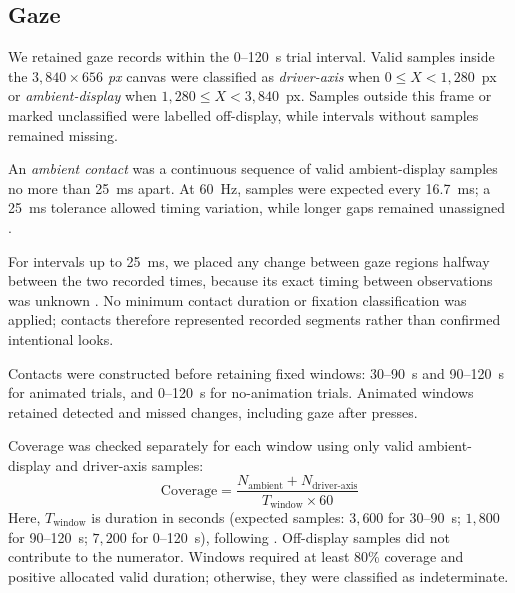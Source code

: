 \documentclass[
english,                 %
bibtex,                  %
includeExtraAbstracts, %
]{kththesis}
\numberwithin{listing}{chapter}
\begin{document}
\subsection{Gaze}
\label{sec:gaze}

We retained gaze records within the 0--120~s trial interval. Valid samples inside the \emph{\(3{,}840 \times 656\) px} canvas were classified as \emph{driver-axis} when \(0 \leq X < 1{,}280\)~px or \emph{ambient-display} when \(1{,}280 \leq X < 3{,}840\)~px. Samples outside this frame or marked unclassified were labelled off-display, while intervals without samples remained missing.

An \emph{ambient contact} was a continuous sequence of valid ambient-display samples no more than 25~ms apart. At 60~Hz, samples were expected every 16.7~ms; a 25~ms tolerance allowed timing variation, while longer gaps remained unassigned \cite{niehorster_fundamentals_2026}.

For intervals up to 25~ms, we placed any change between gaze regions halfway between the two recorded times, because its exact timing between observations was unknown \cite{andersson_sampling_2010}. No minimum contact duration or fixation classification was applied; contacts therefore represented recorded segments rather than confirmed intentional looks.

Contacts were constructed before retaining fixed windows: 30--90~s and 90--120~s for animated trials, and 0--120~s for no-animation trials. Animated windows retained detected and missed changes, including gaze after presses.

Coverage was checked separately for each window using only valid ambient-display and driver-axis samples:
\[
\text{Coverage} =
\frac{N_{\text{ambient}} + N_{\text{driver-axis}}}
{T_{\text{window}} \times 60}
\]
Here, \(T_{\text{window}}\) is duration in seconds (expected samples: \(3{,}600\) for 30--90~s; \(1{,}800\) for 90--120~s; \(7{,}200\) for 0--120~s), following \cite{niehorster_fundamentals_2026}. Off-display samples did not contribute to the numerator. Windows required at least 80\% coverage and positive allocated valid duration; otherwise, they were classified as indeterminate.
\end{document}
